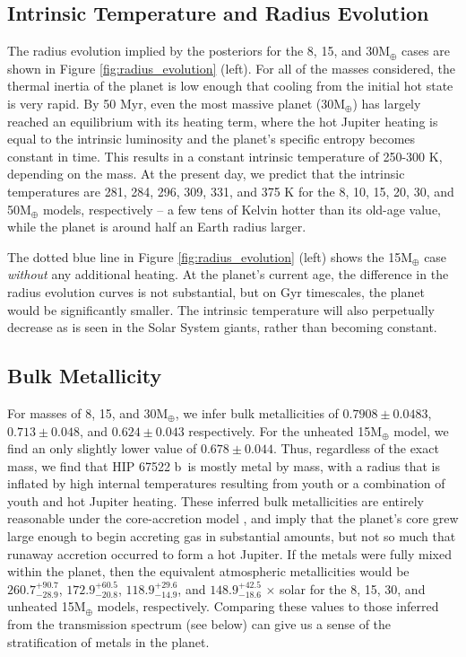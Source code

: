 \documentclass[twocolumn]{aastex63} %
\newcommand{\plname}{HIP 67522 b}
\begin{document}
\subsection{Intrinsic Temperature and Radius Evolution}\label{sec:tint}

The radius evolution implied by the posteriors for the 8, 15, and 30M$_{\oplus}$ cases are shown in Figure \ref{fig:radius_evolution} (left). For all of the masses considered, the thermal inertia of the planet is low enough that cooling from the initial hot state is very rapid. By 50 Myr, even the most massive planet (30M$_\oplus$) has largely reached an equilibrium with its heating term, where the hot Jupiter heating is equal to the intrinsic luminosity and the planet's specific entropy becomes constant in time. This results in a constant intrinsic temperature of 250-300 K, depending on the mass. At the present day, we predict that the intrinsic temperatures are 281, 284, 296, 309, 331, and 375 K for the 8, 10, 15, 20, 30, and 50M$_{\oplus}$ models, respectively -- a few tens of Kelvin hotter than its old-age value, while the planet is around half an Earth radius larger. 

The dotted blue line in Figure \ref{fig:radius_evolution} (left) shows the 15M$_{\oplus}$ case \emph{without} any additional heating. At the planet's current age, the difference in the radius evolution curves is not substantial, but on Gyr timescales, the planet would be significantly smaller. The intrinsic temperature will also perpetually decrease as is seen in the Solar System giants, rather than becoming constant. 

\subsection{Bulk Metallicity}

For masses of 8, 15, and 30M$_\oplus$, we infer bulk metallicities of $0.7908 \pm 0.0483$, $0.713 \pm 0.048$, and $0.624 \pm 0.043$ respectively. For the unheated 15M$_\oplus$ model, we find an only slightly lower value of $0.678 \pm 0.044$. Thus, regardless of the exact mass, we find that \plname\ is mostly metal by mass, with a radius that is inflated by high internal temperatures resulting from youth or a combination of youth and hot Jupiter heating. These inferred bulk metallicities are entirely reasonable under the core-accretion model \citep{Pollack1996}, and imply that the planet's core grew large enough to begin accreting gas in substantial amounts, but not so much that runaway accretion occurred to form a hot Jupiter. If the metals were fully mixed within the planet, then the equivalent atmospheric metallicities would be $260.7^{+90.7}_{-28.9}$, $172.9^{+60.5}_{-20.8}$, $118.9^{+29.6}_{-14.9}$, and $148.9^{+42.5}_{-18.6}$ $\times$ solar for the 8, 15, 30, and unheated 15M$_{\oplus}$ models, respectively. Comparing these values to those inferred from the transmission spectrum (see below) can give us a sense of the stratification of metals in the planet.  %
\end{document}
